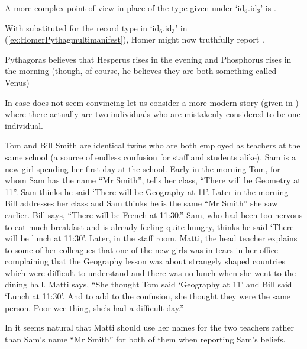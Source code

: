 A more complex point of view in place of the type given under `id$_6$.id$_3$'
is \nexteg{}.
\begin{ex} 
\end{ex} 
With \preveg{} substituted for the record type in `id$_6$.id$_3$' in
(\ref{ex:HomerPythagmultimanifest}), Homer might now truthfully report
\nexteg{}.
\begin{ex} 
Pythagoras believes that Hesperus rises in the evening and Phosphorus
rises in the morning (though, of course, he believes they are both
something called Venus) 
\end{ex} 
In case \preveg{} does not seem convincing let us consider a more
modern story (given in \nexteg{}) where there actually are two
individuals who are mistakenly considered to be one individual.
\begin{ex} 
Tom and Bill Smith are identical twins who are both employed as
teachers at the same school (a source of endless confusion for staff
and students alike).  Sam is a new girl spending her first day at the
school.  Early in the morning Tom, for whom Sam has the name ``Mr
Smith'', tells her class, ``There will be Geometry at 11''.  Sam
thinks he said `There will be Geography at 11'.  Later in the
morning Bill addresses her class and Sam thinks he is the same
``Mr Smith'' she saw earlier.  Bill says, ``There will be French
at 11:30.'' Sam, who had been too nervous to eat much breakfast and is
already feeling quite hungry, thinks he said `There will be lunch at
11:30'.  Later, in the staff room, Matti, the head teacher explains
to some of her colleagues that one of the new girls was in tears in
her office complaining that the Geography lesson was about strangely
shaped countries which were difficult to understand and there was no
lunch when she went to the dining hall.  Matti says, ``She thought Tom
said `Geography at 11' and Bill said `Lunch at 11:30'.  And to add to
the confusion, she thought they were the same person.  Poor wee thing,
she's had a difficult day.'' 
\end{ex} 
In \preveg{} it seems natural that Matti should use her names for the
two teachers rather than Sam's name ``Mr Smith'' for both
of them when reporting Sam's beliefs.
  
